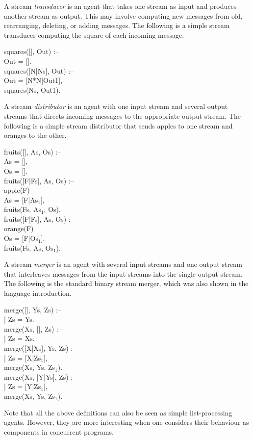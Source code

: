 A stream {\em transducer} is an agent that takes one stream as input
and produces another stream as output.  This may involve computing new
messages from old, rearranging, deleting, or adding messages.  The
following is a simple stream transducer computing the square of each
incoming message.
%
\begin{program}
squares([], Out) :-- \\
\>\cond\>Out = [].  \\
squares([N|Ns], Out) :-- \\
\>\cond\>Out = [N*N|Out1], \\
\>\>squares(Ns, Out1).
\end{program}%
%
A stream {\em distributor} is an agent with one input stream and
several output streams that directs incoming messages to the
appropriate output stream.  The following is a simple stream
distributor that sends apples to one stream and oranges to the other.
%
\begin{program}
fruits([], As, Os) :-- \\
\>\cond\>As = [], \\
\>\>Os = [].  \\
fruits([F|Fs], As, Os) :-- \\
\>\>	apple(F) \\
\>\cond\>As = [F|As$_1$], \\
\>\>	fruits(Fs, As$_1$, Os).  \\
fruits([F|Fs], As, Os) :-- \\
\>\>	orange(F) \\
\>\cond\>	Os = [F|Os$_1$], \\
\>\>	fruits(Fs, As, Os$_1$).
\end{program}%
%
A stream {\em merger} is an agent with several input streams and one
output stream that interleaves messages from the input streams into
the single output stream.  The following is the standard binary stream
merger, which was also shown in the language introduction.
%
\begin{program}
merge([], Ys, Zs) :-- \\
\>|\>	Zs = Ys.  \\
merge(Xs, [], Zs) :-- \\
\>|\>	Zs = Xs.  \\
merge([X|Xs], Ys, Zs) :-- \\
\>|\>	Zs = [X|Zs$_1$], \\
\>\>	merge(Xs, Ys, Zs$_1$).  \\
merge(Xs, [Y|Ys], Zs) :-- \\
\>|\>	Zs = [Y|Zs$_1$], \\
\>\>	merge(Xs, Ys, Zs$_1$).
\end{program}%
%
Note that all the above definitions can also be seen as simple
list-processing agents.  However, they are more interesting when one
considers their behaviour as components in concurrent programs.

